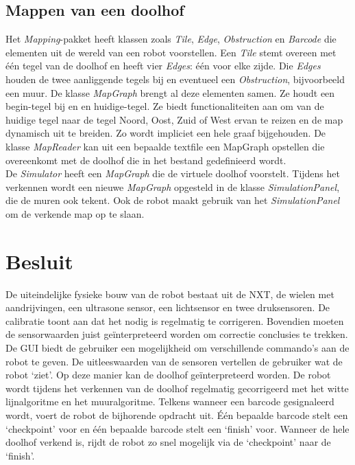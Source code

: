 \documentclass[eind]{penoverslag}
\begin{document}
\subsection{Mappen van een doolhof} %
\label{ssec:mapping}
Het \textit{Mapping}-pakket heeft klassen zoals \textit{Tile}, \textit{Edge}, \textit{Obstruction} en \textit{Barcode} die elementen uit de wereld van een robot voorstellen. Een \textit{Tile} stemt overeen met \'e\'en tegel van de doolhof en heeft vier \textit{Edges}: \'e\'en voor elke zijde. Die \textit{Edges} houden de twee aanliggende tegels bij en eventueel een \textit{Obstruction}, bijvoorbeeld een muur. De klasse \textit{MapGraph} brengt al deze elementen samen. Ze houdt een begin-tegel bij en en huidige-tegel. Ze biedt functionaliteiten aan om van de huidige tegel naar de tegel Noord, Oost, Zuid of West ervan te reizen en de map dynamisch uit te breiden. Zo wordt impliciet een hele graaf bijgehouden. De klasse \textit{MapReader} kan uit een bepaalde textfile een MapGraph opstellen die overeenkomt met de doolhof die in het bestand gedefinieerd wordt.\\

De \textit{Simulator} heeft een \textit{MapGraph} die de virtuele doolhof voorstelt. Tijdens het verkennen wordt een nieuwe \textit{MapGraph} opgesteld in de klasse \textit{SimulationPanel}, die de muren ook tekent. Ook de robot maakt gebruik van het \textit{SimulationPanel} om de verkende map op te slaan.

\section{Besluit} %
\label{sec:besl}
De uiteindelijke fysieke bouw van de robot bestaat uit de NXT, de wielen met aandrijvingen, een ultrasone sensor, een lichtsensor en twee druksensoren. De calibratie toont aan dat het nodig is regelmatig te corrigeren. Bovendien moeten de sensorwaarden juist ge\"interpreteerd worden om correctie conclusies te trekken.\\

De GUI biedt de gebruiker een mogelijkheid om verschillende commando's aan de robot te geven. De uitleeswaarden van de sensoren vertellen de gebruiker wat de robot `ziet'. Op deze manier kan de doolhof ge\"interpreteerd worden. De robot wordt tijdens het verkennen van de doolhof regelmatig gecorrigeerd met het witte lijnalgoritme en het muuralgoritme. Telkens wanneer een barcode gesignaleerd wordt, voert de robot de bijhorende opdracht uit. \'E\'en bepaalde barcode stelt een `checkpoint' voor en \'e\'en bepaalde barcode stelt een `finish' voor. Wanneer de hele doolhof verkend is, rijdt de robot zo snel mogelijk via de `checkpoint' naar de `finish'.\\
\end{document}
